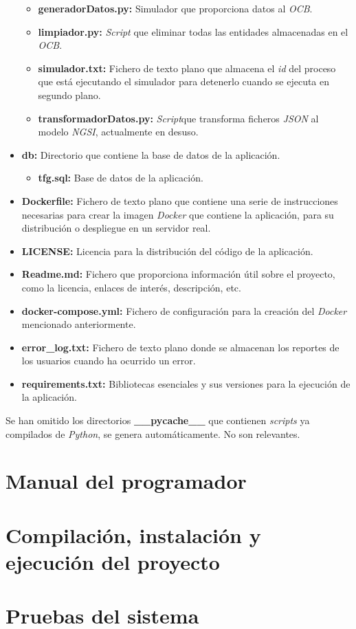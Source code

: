 \begin{itemize}
\begin{itemize}
        \item \textbf{generadorDatos.py:} Simulador que proporciona datos al \textit{OCB}.
        \item \textbf{limpiador.py:} \textit{Script} que eliminar todas las entidades almacenadas en el \textit{OCB}.
        \item \textbf{simulador.txt:} Fichero de texto plano que almacena el \textit{id} del proceso que está ejecutando el simulador para detenerlo cuando se ejecuta en segundo plano.
        \item \textbf{transformadorDatos.py:} \textit{Script}que transforma ficheros \textit{JSON} al modelo \textit{NGSI}, actualmente en desuso.
    \end{itemize}
    \item \textbf{db:} Directorio que contiene la base de datos de la aplicación.
    \begin{itemize}
        \item \textbf{tfg.sql:} Base de datos de la aplicación.
    \end{itemize}
    \item \textbf{Dockerfile:} Fichero de texto plano que contiene una serie de instrucciones necesarias para crear la imagen \textit{Docker} que contiene la aplicación, para su distribución o despliegue en un servidor real.
    \item \textbf{LICENSE:} Licencia para la  distribución del código de la aplicación.
    \item \textbf{Readme.md:} Fichero que proporciona información útil sobre el proyecto, como la licencia, enlaces de interés, descripción, etc.
    \item \textbf{docker-compose.yml:} Fichero de configuración para la creación del \textit{Docker} mencionado anteriormente.
    \item \textbf{error\_log.txt:} Fichero de texto plano donde se almacenan los reportes de los usuarios cuando ha ocurrido un error.
    \item \textbf{requirements.txt:} Bibliotecas esenciales y sus versiones para la ejecución de la aplicación.
\end{itemize}

Se han omitido los directorios \textbf{\_\_pycache\_\_} que contienen \textit{scripts} ya compilados de \textit{Python}, se genera automáticamente. No son relevantes.


\section{Manual del programador}

\section{Compilación, instalación y ejecución del proyecto}

\section{Pruebas del sistema}
